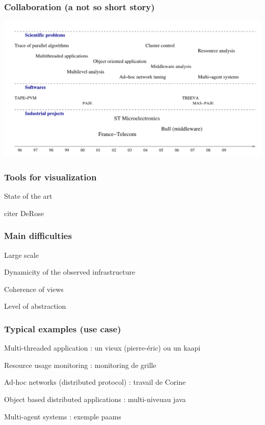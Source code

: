 \begin{frame}

\frametitle{Collaboration (a not so short story)}
\includegraphics[width=1.1\textwidth]{img/collaboration.pdf}
\end{frame}


\begin{frame}
\frametitle{Tools for visualization}
State of the art

citer DeRose
\end{frame}

\begin{frame}
\frametitle{Main difficulties}
\begin{description}
\item Large scale
\item Dynamicity of the observed infrastructure
\item Coherence of views
\item Level of abstraction
\end{description}
\end{frame}

\begin{frame}
\frametitle{Typical examples (use case)}
\begin{description}
\item Multi-threaded application : un vieux (pierre-éric) ou un kaapi 
\item Resource usage monitoring : monitoring de grille 
\item Ad-hoc networks (distributed protocol) : travail de Corine
\item 
\item Object based distributed applications : multi-niveuau java
\item Multi-agent systems : exemple paams
\end{description}
\end{frame}
